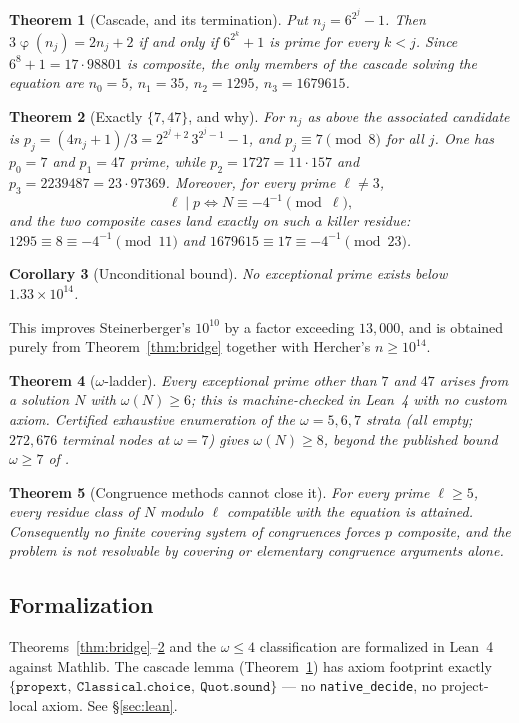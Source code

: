 \documentclass[11pt,reqno]{amsart}
\theoremstyle{plain}
\newtheorem{theorem}{Theorem}[section]
\newtheorem{corollary}[theorem]{Corollary}
\theoremstyle{definition}
\DeclareMathOperator{\tot}{\varphi}
\begin{document}
\begin{theorem}[Cascade, and its termination]\label{thm:cascade}
Put $n_j=6^{2^j}-1$. Then $3\tot(n_j)=2n_j+2$ if and only if $6^{2^k}+1$ is prime for every
$k<j$. Since $6^{8}+1=17\cdot 98801$ is composite, the only members of the cascade solving the
equation are $n_0=5$, $n_1=35$, $n_2=1295$, $n_3=1679615$.
\end{theorem}

\begin{theorem}[Exactly $\{7,47\}$, and why]\label{thm:747}
For $n_j$ as above the associated candidate is $p_j=(4n_j+1)/3=2^{2^j+2}\,3^{2^j-1}-1$, and
$p_j\equiv7\pmod 8$ for all $j$. One has $p_0=7$ and $p_1=47$ prime, while
$p_2=1727=11\cdot157$ and $p_3=2239487=23\cdot 97369$. Moreover, for every prime $\ell\neq3$,
\[
  \ell\mid p \iff N\equiv-4^{-1}\!\!\pmod{\ell},
\]
and the two composite cases land exactly on such a killer residue:
$1295\equiv 8\equiv-4^{-1}\pmod{11}$ and $1679615\equiv17\equiv-4^{-1}\pmod{23}$.
\end{theorem}

\begin{corollary}[Unconditional bound]\label{cor:bound}
No exceptional prime exists below $1.33\times10^{14}$.
\end{corollary}

\noindent This improves Steinerberger's $10^{10}$ by a factor exceeding $13{,}000$, and is
obtained purely from Theorem~\ref{thm:bridge} together with Hercher's $n\ge10^{14}$.

\begin{theorem}[$\omega$-ladder]\label{thm:omega}
Every exceptional prime other than $7$ and $47$ arises from a solution $N$ with
$\omega(N)\ge6$; this is machine-checked in Lean~4 with no custom axiom. Certified exhaustive
enumeration of the $\omega=5,6,7$ strata (all empty; $272{,}676$ terminal nodes at $\omega=7$)
gives $\omega(N)\ge8$, beyond the published bound $\omega\ge7$ of \cite{Herch}.
\end{theorem}

\begin{theorem}[Congruence methods cannot close it]\label{thm:nogo}
For every prime $\ell\ge5$, every residue class of $N$ modulo $\ell$ compatible with the
equation is attained. Consequently no finite covering system of congruences forces $p$
composite, and the problem is not resolvable by covering or elementary congruence arguments
alone.
\end{theorem}

\subsection*{Formalization}
Theorems~\ref{thm:bridge}--\ref{thm:747} and the $\omega\le4$ classification are formalized in
Lean~4 against Mathlib. The cascade lemma (Theorem~\ref{thm:cascade}) has axiom footprint
exactly $\{\texttt{propext},\ \texttt{Classical.choice},\ \texttt{Quot.sound}\}$ --- no
\texttt{native\_decide}, no project-local axiom. See \S\ref{sec:lean}.
\end{document}
